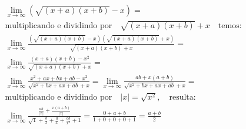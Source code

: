\begin{ex}
\begin{align}
&\lim_{x\rightarrow \infty} (\sqrt{(x+a)(x+b)}-x)=\nonumber\\
&\text{multiplicando e dividindo por}\quad \sqrt{(x+a)(x+b)}+x\quad\text{temos:}\nonumber\\
&\lim_{x\rightarrow \infty} \frac{(\sqrt{(x+a)(x+b)}-x)(\sqrt{(x+a)(x+b)}+x)}{\sqrt{(x+a)(x+b)}+x}=\nonumber\\
&\lim_{x\rightarrow \infty} \frac{(x+a)(x+b)-x^2}{\sqrt{(x+a)(x+b)}+x}=\nonumber\\
&\lim_{x\rightarrow \infty} \frac{x^2+ax+bx+ab-x^2}{\sqrt{x^2+bx+ax+ab}+x}=\lim_{x\rightarrow \infty} \frac{ab+x(a+b)}{\sqrt{x^2+bx+ax+ab}+x}=\nonumber\\
&\text{multiplicando e dividindo por}\quad \left|x\right|=\sqrt{x^2},\quad\text{resulta:}\nonumber\\
&\lim_{x\rightarrow \infty} \frac{\frac{ab}{\left|x\right|}+\frac{x(a+b)}{\left|x\right|}}{{\sqrt1+\frac{b}{x}+\frac{a}{x}+\frac{ab}{x^2}}+1}=\frac{0+a+b}{1+0+0+0+1}=\frac{a+b}{2}\nonumber
\end{align}
\end{ex}